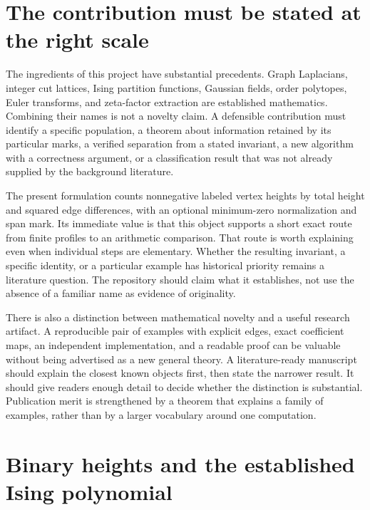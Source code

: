 \documentclass[
  11pt,
  a4paper,
]{report}
\begin{document}
\hypertarget{the-contribution-must-be-stated-at-the-right-scale}{%
\section{The contribution must be stated at the right
scale}\label{the-contribution-must-be-stated-at-the-right-scale}}

The ingredients of this project have substantial precedents. Graph
Laplacians, integer cut lattices, Ising partition functions, Gaussian
fields, order polytopes, Euler transforms, and zeta-factor extraction
are established mathematics. Combining their names is not a novelty
claim. A defensible contribution must identify a specific population, a
theorem about information retained by its particular marks, a verified
separation from a stated invariant, a new algorithm with a correctness
argument, or a classification result that was not already supplied by
the background literature.

The present formulation counts nonnegative labeled vertex heights by
total height and squared edge differences, with an optional minimum-zero
normalization and span mark. Its immediate value is that this object
supports a short exact route from finite profiles to an arithmetic
comparison. That route is worth explaining even when individual steps
are elementary. Whether the resulting invariant, a specific identity, or
a particular example has historical priority remains a literature
question. The repository should claim what it establishes, not use the
absence of a familiar name as evidence of originality.

There is also a distinction between mathematical novelty and a useful
research artifact. A reproducible pair of examples with explicit edges,
exact coefficient maps, an independent implementation, and a readable
proof can be valuable without being advertised as a new general theory.
A literature-ready manuscript should explain the closest known objects
first, then state the narrower result. It should give readers enough
detail to decide whether the distinction is substantial. Publication
merit is strengthened by a theorem that explains a family of examples,
rather than by a larger vocabulary around one computation.

\hypertarget{binary-heights-and-the-established-ising-polynomial}{%
\section{Binary heights and the established Ising
polynomial}\label{binary-heights-and-the-established-ising-polynomial}}
\end{document}
